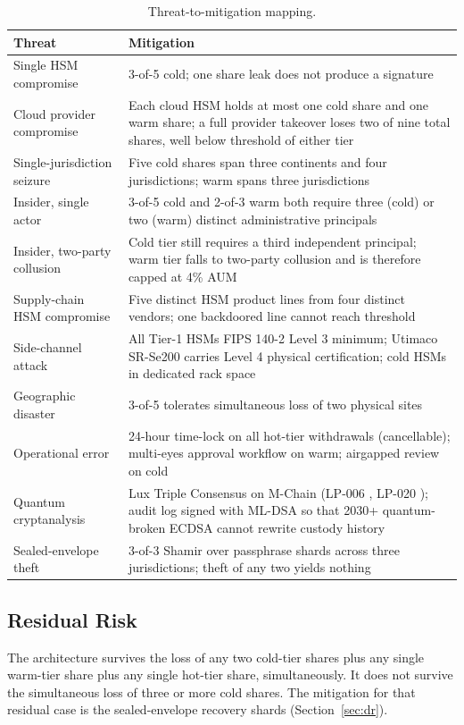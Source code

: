 \begin{table}[h]
\centering
\small
\begin{tabular}{p{6.5cm}p{8.5cm}}
\toprule
\textbf{Threat} & \textbf{Mitigation} \\
\midrule
Single HSM compromise &
3-of-5 cold; one share leak does not produce a signature \\
Cloud provider compromise &
Each cloud HSM holds at most one cold share and one warm share; a
full provider takeover loses two of nine total shares, well below
threshold of either tier \\
Single-jurisdiction seizure &
Five cold shares span three continents and four jurisdictions; warm
spans three jurisdictions \\
Insider, single actor &
3-of-5 cold and 2-of-3 warm both require three (cold) or two (warm)
distinct administrative principals \\
Insider, two-party collusion &
Cold tier still requires a third independent principal; warm tier
falls to two-party collusion and is therefore capped at 4\% AUM \\
Supply-chain HSM compromise &
Five distinct HSM product lines from four distinct vendors; one
backdoored line cannot reach threshold \\
Side-channel attack &
All Tier-1 HSMs FIPS 140-2 Level 3 minimum; Utimaco SR-Se200 carries
Level 4 physical certification; cold HSMs in dedicated rack space \\
Geographic disaster &
3-of-5 tolerates simultaneous loss of two physical sites \\
Operational error &
24-hour time-lock on all hot-tier withdrawals (cancellable);
multi-eyes approval workflow on warm; airgapped review on cold \\
Quantum cryptanalysis &
Lux Triple Consensus on M-Chain (LP-006 \cite{lp006},
LP-020 \cite{lp020}); audit log signed with ML-DSA so that 2030+
quantum-broken ECDSA cannot rewrite custody history \\
Sealed-envelope theft &
3-of-3 Shamir over passphrase shards across three jurisdictions;
theft of any two yields nothing \\
\bottomrule
\end{tabular}
\caption{Threat-to-mitigation mapping.}
\label{tab:threats}
\end{table}

\subsection{Residual Risk}

\begin{requirement}
The architecture survives the loss of any two cold-tier shares plus
any single warm-tier share plus any single hot-tier share, simultaneously.
It does not survive the simultaneous loss of three or more cold shares.
The mitigation for that residual case is the sealed-envelope recovery
shards (Section~\ref{sec:dr}).
\end{requirement}


